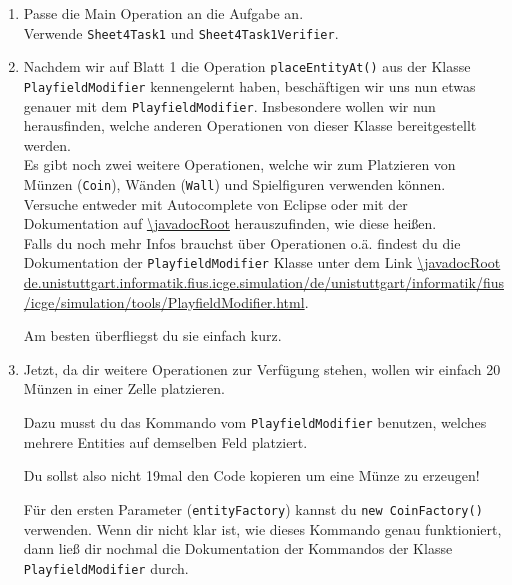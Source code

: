 
\label{ex4}

\begin{enumerate}
    \item 
    Passe die Main Operation an die Aufgabe an.\\
		Verwende \lstinline{Sheet4Task1} und \lstinline{Sheet4Task1Verifier}.
\end{enumerate}



\begin{enumerate} \setcounter{enumi}{1}
    

    \item Nachdem wir auf Blatt 1 die Operation \lstinline{placeEntityAt()} aus der Klasse \lstinline{PlayfieldModifier} kennengelernt haben, beschäftigen wir uns nun etwas genauer mit dem \lstinline{PlayfieldModifier}.
        Insbesondere wollen wir nun herausfinden, welche anderen Operationen von dieser Klasse bereitgestellt werden. \\
        Es gibt noch zwei weitere Operationen, welche wir zum Platzieren von Münzen (\lstinline{Coin}), Wänden (\lstinline{Wall}) und Spielfiguren verwenden können.\\

        Versuche entweder mit Autocomplete von Eclipse oder mit der Dokumentation auf \url{\javadocRoot} herauszufinden, wie diese heißen.\\

        Falls du noch mehr Infos brauchst über Operationen o.ä. findest du die Dokumentation der \newline \lstinline{PlayfieldModifier} Klasse unter dem Link \url{\javadocRoot de.unistuttgart.informatik.fius.icge.simulation/de/unistuttgart/informatik/fius/icge/simulation/tools/PlayfieldModifier.html}.

        Am besten überfliegst du sie einfach kurz.

\end{enumerate}



\begin{enumerate} \setcounter{enumi}{2}
    \item Jetzt, da dir weitere Operationen zur Verfügung stehen, wollen wir einfach 20 Münzen in einer Zelle platzieren.

        Dazu musst du das Kommando vom \lstinline{PlayfieldModifier} benutzen, welches mehrere Entities auf demselben Feld platziert.

        Du sollst also nicht 19mal den Code kopieren um eine Münze zu erzeugen!

        Für den ersten Parameter (\lstinline{entityFactory}) kannst du \lstinline{new CoinFactory()} verwenden.
        Wenn dir nicht klar ist, wie dieses Kommando genau funktioniert, dann ließ dir nochmal die Dokumentation der Kommandos der Klasse \lstinline{PlayfieldModifier} durch.
\end{enumerate}




